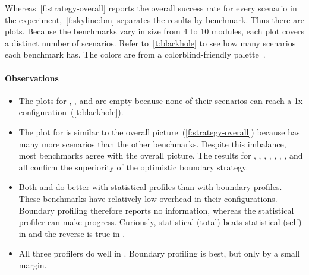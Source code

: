 Whereas~\cref{f:strategy-overall} reports the overall success rate for every
scenario in the experiment,~\cref{f:skyline:bm} separates the results
by benchmark.
Thus there are \numgtp{} plots.
Because the benchmarks vary in size from 4 to 10 modules,
each plot covers a distinct number of scenarios.
Refer to~\cref{t:blackhole} to see how many scenarios each
benchmark has.
The colors are from a colorblind-friendly palette~\cite{w-nature-2011}.

\paragraph{Observations}

\begin{itemize}
  \item
    The plots for , , and 
    are empty because none of their scenarios can reach a 1x configuration~(\cref{t:blackhole}).

  \item
    The plot for  is similar to the overall picture~(\cref{f:strategy-overall})
    because  has many more scenarios than the other benchmarks.
    Despite this imbalance, most benchmarks agree with the overall picture.
    The results for , , ,
    , , , , and 
    all confirm the superiority of the optimistic boundary strategy.

  \item
    Both  and  do better with statistical profiles
    than with boundary profiles.
    These benchmarks have relatively low overhead in their configurations.
    Boundary profiling therefore reports no information, whereas the statistical
    profiler can make progress.
    Curiously, statistical (total) beats statistical (self) in
     and the reverse is true in .

  \item
    All three profilers do well in .
    Boundary profiling is best, but only by a small margin.

\end{itemize}

